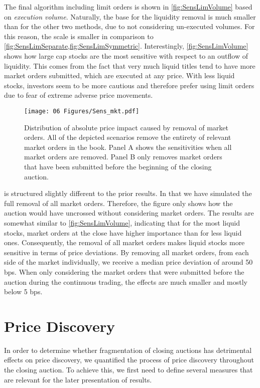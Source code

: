 \documentclass[11pt,a4paper, notitlepage]{article}
\begin{document}
	The final algorithm including limit orders is shown in \cref{fig:SensLimVolume} based on \emph{execution volume}. Naturally, the base for the liquidity removal is much smaller than for the other two methods, due to not considering un-executed volumes. For this reason, the scale is smaller in comparison to \cref{fig:SensLimSeparate,fig:SensLimSymmetric}. Interestingly, \cref{fig:SensLimVolume} shows how large cap stocks are the most sensitive with respect to an outflow of liquidity. This comes from the fact that very much liquid titles tend to have more market orders submitted, which are executed at any price. With less liquid stocks, investors seem to be more cautious and therefore prefer using limit orders due to fear of extreme adverse price movements.
	
	\begin{figure}[tp]
		\centering
		\texttt{[image: 06 Figures/Sens\_mkt.pdf]}
		\caption{Distribution of absolute price impact caused by removal of market orders. All of the depicted scenarios remove the entirety of relevant market orders in the book. Panel A shows the sensitivities when all market orders are removed. Panel B only removes market orders that have been submitted before the beginning of the closing auction.}
		\label{fig:SensMkt}
	\end{figure}
	
	 is structured slightly different to the prior results. In that we have simulated the full removal of all market orders. Therefore, the figure only shows how the auction would have uncrossed without considering market orders. The results are somewhat similar to \cref{fig:SensLimVolume}, indicating that for the most liquid stocks, market orders at the close have higher importance than for less liquid ones. Consequently, the removal of all market orders makes liquid stocks more sensitive in terms of price deviations. By removing all market orders, from each side of the market individually, we receive a median price deviation of around 50 bps. When only considering the market orders that were submitted before the auction during the continuous trading, the effects are much smaller and mostly below 5 bps.
	
	
	\section{Price Discovery} \label{sec:Discovery}
	
	In order to determine whether fragmentation of closing auctions has detrimental effects on price discovery, we quantified the process of price discovery throughout the closing auction. To achieve this, we first need to define several measures that are relevant for the later presentation of results.
	
\end{document}
